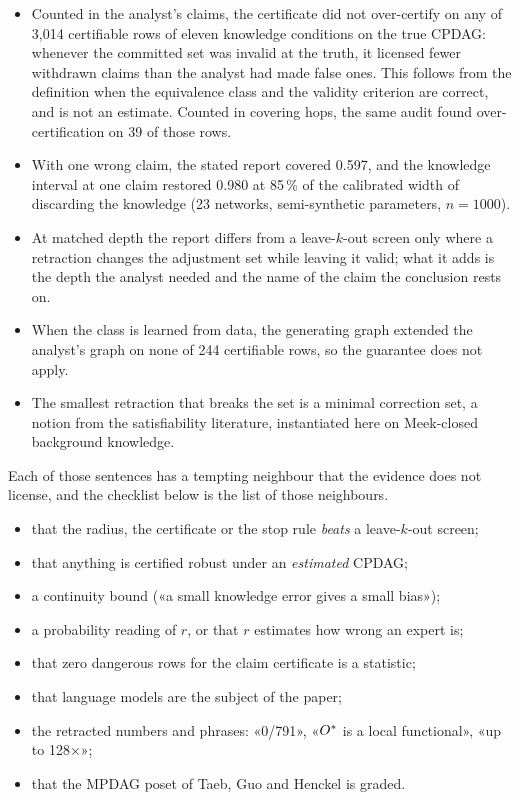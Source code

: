 \begin{sonorio}
\begin{itemize}[nosep, leftmargin=*]
\item Counted in the analyst's claims, the certificate did not over-certify on any of 3,014 certifiable
  rows of eleven knowledge conditions on the true CPDAG: whenever the committed set was invalid at the truth, it licensed fewer withdrawn claims than the
  analyst had made false ones. This follows from the definition when the equivalence class and the
  validity criterion are correct, and is not an estimate. Counted in covering hops, the same audit found
  over-certification on 39 of those rows.
\item With one wrong claim, the stated report covered 0.597, and the knowledge interval at one claim
  restored 0.980 at 85\,\% of the calibrated width of discarding the knowledge (23 networks,
  semi-synthetic parameters, $n = 1000$).
\item At matched depth the report differs from a leave-$k$-out screen only where a retraction changes the
  adjustment set while leaving it valid; what it adds is the
  depth the analyst needed and the name of the claim the conclusion rests on.
\item When the class is learned from data, the generating graph extended the analyst's graph on none of 244
  certifiable rows, so the guarantee does not apply.
\item The smallest retraction that breaks the set is a minimal correction set, a notion from the
  satisfiability literature, instantiated here on Meek-closed background knowledge.
\end{itemize}
\end{sonorio}

Each of those sentences has a tempting neighbour that the evidence does not license, and the checklist
below is the list of those neighbours.

\begin{noprato}
\begin{itemize}[nosep, leftmargin=*]
\item that the radius, the certificate or the stop rule \emph{beats} a leave-$k$-out screen;
\item that anything is certified robust under an \emph{estimated} CPDAG;
\item a continuity bound («a small knowledge error gives a small bias»);
\item a probability reading of $r$, or that $r$ estimates how wrong an expert is;
\item that zero dangerous rows for the claim certificate is a statistic;
\item that language models are the subject of the paper;
\item the retracted numbers and phrases: «0/791», «$O^{*}$ is a local functional», «up to 128×»;
\item that the MPDAG poset of Taeb, Guo and Henckel is graded.
\end{itemize}
\end{noprato}

